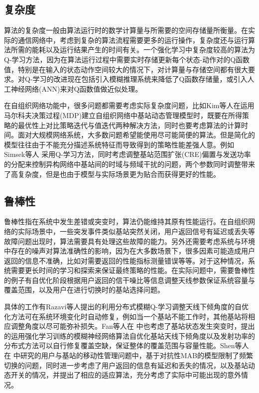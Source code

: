 \documentclass{IEEEtran}
\begin{document}
\subsection{复杂度}
算法的复杂度一般由算法运行时的数学计算量与所需要的空间存储量所衡量。在实际的通信网络中，考虑到复杂的算法流程需要更多的运行操作，复杂度还与运行算法所需的能耗以及运行结果产生的时间有关。一个强化学习中复杂度较高的算法为Q-学习方法，因为在算法运行过程中需要实时存储更新每个状态-动作对的Q函数值，特别是在输入的状态动作空间较大的情况下，对计算量与存储空间都有很大要求。对Q-学习的改进现在包括引入模糊推理系统来降低了Q函数存储量，或引入人工神经网络(ANN)来对Q函数值做近似处理\cite{Ghadimi2017}。

在自组织网络功能中，很多问题都需要考虑实际复杂度问题，比如Kim等人\cite{Kim2014}在运用马尔科夫决策过程(MDP)建立自组织网络中基站动态管理模型时，既要在所得策略的最优性上对比策略迭代与值迭代两种解决方法，同时也要考虑算法的计算时间。面对大规模网络系统，大多数问题希望能使用尽可能简便的算法。但是简化的模型往往由于不能充分描述系统特征而导致得到的策略性能差强人意。例如Simsek等人\cite{Simsek2015} 采用Q-学习方法，同时考虑调整基站范围扩张(CRE)偏置与发送功率的分配来控制异构网络中基站间的时域与频域干扰的问题，两个参数同时调整带来了高复杂度，但是也由于模型与实际场景更为贴合而获得更好的性能。

\subsection{鲁棒性}
鲁棒性指在系统中发生差错或突变时，算法仍能维持其原有性能运行。在自组织网络的实际场景中，一些突发事件类似基站突然关闭，用户返回信号有延迟或丢失等故障问题出现时，算法需要具有处理这些故障的能力。另外还需要考虑系统与环境中存在的噪声对算法准确性的影响，因为在大多数场景下，很多因素可能造成用户返回的信息不准确，比如对需要返回的性能指标测量错误等等。对于这种情况，系统需要更长时间的学习和探索来保证最终策略的性能。在实际问题中，需要鲁棒性的例子有自优化阶段根据用户返回的信干噪比等信息调整天线参数保证系统容量与覆盖范围，以及用户在进行切换时的基站选择问题。

具体的工作有Razavi等人\cite{Razavi2010}提出的利用分布式模糊Q-学习调整天线下倾角度的自优化方法可在系统环境变化时自动修复，例如当一个基站不能工作时，其他基站将相应调整角度以尽可能弥补损失。Fan等人在\cite{Fan2014} 中也考虑了基站状态发生突变时，提出的运用强化学习训练的模糊神经网络算法自优化基站天线下倾角度以及发射功率的分布式方法可以自行修复覆盖空缺，保证整体的覆盖范围与容量性能。Shen等人在\cite{Shen2016} 中研究的用户与基站的移动性管理问题中，基于对抗性MAB的模型限制了频繁切换的问题，同时进一步考虑了用户返回的信息有延迟和丢失的情况，以及基站动态开关的情况，并提出了相应的适应算法，充分考虑了实际中可能出现的意外情况。
\end{document}
